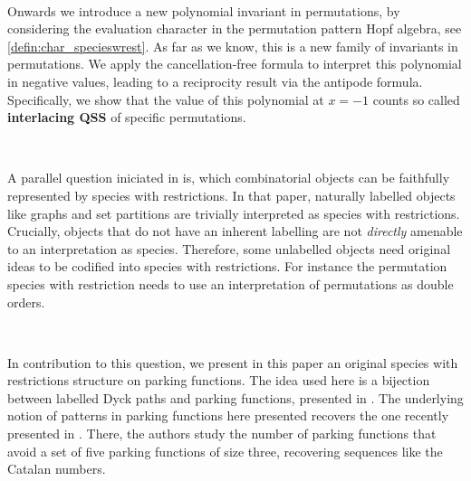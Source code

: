 \documentclass[12pt, reqno]{amsart}
\theoremstyle{definition}
\begin{document}
\

Onwards we introduce a new polynomial invariant in permutations, by considering the evaluation character in the permutation pattern Hopf algebra, see \cref{defin:char_specieswrest}.
As far as we know, this is a new family of invariants in permutations.
We apply the cancellation-free formula to interpret this polynomial in negative values, leading to a reciprocity result via the antipode formula.
Specifically, we show that the value of this polynomial at $x = -1$ counts so called \textbf{interlacing QSS} of specific permutations.

\

A parallel question iniciated in \cite{Penaguiao2020} is, which combinatorial objects can be faithfully represented by species with restrictions.
In that paper, naturally labelled objects like graphs and set partitions are trivially interpreted as species with restrictions.
Crucially, objects that do not have an inherent labelling are not \textit{directly} amenable to an interpretation as species.
Therefore, some unlabelled objects need original ideas to be codified into species with restrictions. 
For instance the permutation species with restriction needs to use an interpretation of permutations as double orders.

\

In contribution to this question, we present in this paper an original species with restrictions structure on parking functions.
The idea used here is a bijection between labelled Dyck paths and parking functions, presented in \cite{Loehr,BGLPV2021}.
The underlying notion of patterns in parking functions here presented recovers the one recently presented in \cite{adeniran2022pattern}.
There, the authors study the number of parking functions that avoid a set of five parking functions of size three, recovering sequences like the Catalan numbers.

\
\end{document}
